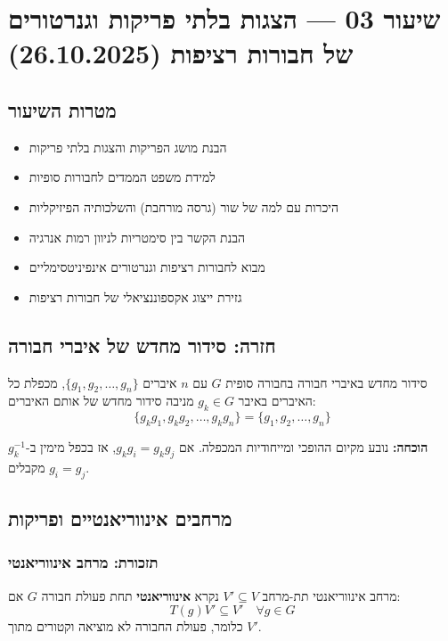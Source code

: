 \section{שיעור 03 — הצגות בלתי פריקות וגנרטורים של חבורות רציפות (26.10.2025)}

\subsection*{מטרות השיעור}
\begin{itemize}
    \item הבנת מושג הפריקות והצגות בלתי פריקות
    \item למידת משפט הממדים לחבורות סופיות
    \item היכרות עם למה של שור (גרסה מורחבת) והשלכותיה הפיזיקליות
    \item הבנת הקשר בין סימטריות לניוון רמות אנרגיה
    \item מבוא לחבורות רציפות וגנרטורים אינפיניטסימליים
    \item גזירת ייצוג אקספוננציאלי של חבורות רציפות
\end{itemize}

\subsection{חזרה: סידור מחדש של איברי חבורה}

\begin{theorembox}{סידור מחדש באיברי חבורה}
בחבורה סופית $G$ עם $n$ איברים $\{g_1, g_2, \ldots, g_n\}$, מכפלת כל האיברים באיבר $g_k \in G$ מניבה סידור מחדש של אותם האיברים:
\[
\{g_k g_1, g_k g_2, \ldots, g_k g_n\} = \{g_1, g_2, \ldots, g_n\}
\]
\end{theorembox}

\textbf{הוכחה:} נובע מקיום ההופכי ומייחודיות המכפלה. אם $g_k g_i = g_k g_j$, אז בכפל מימין ב-$g_k^{-1}$ מקבלים $g_i = g_j$.

\subsection{מרחבים אינווריאנטיים ופריקות}

\subsubsection{תזכורת: מרחב אינווריאנטי}

\begin{definitionbox}{מרחב אינווריאנטי}
תת-מרחב $V' \subseteq V$ נקרא \textbf{אינווריאנטי} תחת פעולת חבורה $G$ אם:
\[
T(g) V' \subseteq V' \quad \forall g \in G
\]
כלומר, פעולת החבורה לא מוציאה וקטורים מתוך $V'$.
\end{definitionbox}

